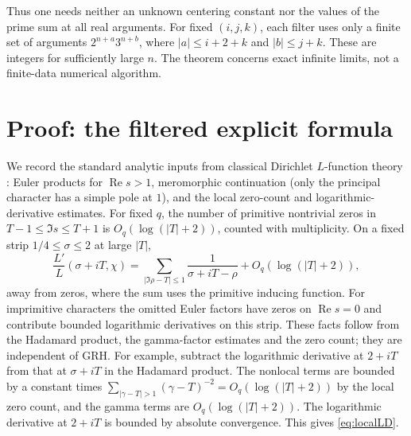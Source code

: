 \documentclass[11pt]{article}
\theoremstyle{remark}\newtheorem{remark}[theorem]{Remark}
\newcommand{\Rea}{\operatorname{Re}}\newcommand{\ord}{\operatorname{ord}}
\begin{document}
Thus one needs neither an unknown centering constant nor the values of the prime sum at all real arguments. For fixed $(i,j,k)$, each filter uses only a finite set of arguments $2^{n+a}3^{n+b}$, where $|a|\le i+2+k$ and $|b|\le j+k$. These are integers for sufficiently large $n$. The theorem concerns exact infinite limits, not a finite-data numerical algorithm.

\section{Proof: the filtered explicit formula}
We record the standard analytic inputs from classical Dirichlet $L$-function theory \cite{davenport,mv}: Euler products for $\Rea s>1$, meromorphic continuation (only the principal character has a simple pole at $1$), and the local zero-count and logarithmic-derivative estimates. For fixed $q$, the number of primitive nontrivial zeros in $T-1\le\Im s\le T+1$ is $O_q(\log(|T|+2))$, counted with multiplicity. On a fixed strip $1/4\le \sigma\le2$ at large $|T|$,
\begin{equation}\label{eq:localLD}
 \frac{L'}{L}(\sigma+iT,\chi)=
 \sum_{|\Im\rho-T|\le1}\frac{1}{\sigma+iT-\rho}
 +O_q(\log(|T|+2)),
\end{equation}
away from zeros, where the sum uses the primitive inducing function. For imprimitive characters the omitted Euler factors have zeros on $\Rea s=0$ and contribute bounded logarithmic derivatives on this strip. These facts follow from the Hadamard product, the gamma-factor estimates and the zero count; they are independent of GRH. For example, subtract the logarithmic derivative at $2+iT$ from that at $\sigma+iT$ in the Hadamard product. The nonlocal terms are bounded by a constant times $\sum_{|\gamma-T|>1}(\gamma-T)^{-2}=O_q(\log(|T|+2))$ by the local zero count, and the gamma terms are $O_q(\log(|T|+2))$. The logarithmic derivative at $2+iT$ is bounded by absolute convergence. This gives \eqref{eq:localLD}.
\end{document}

